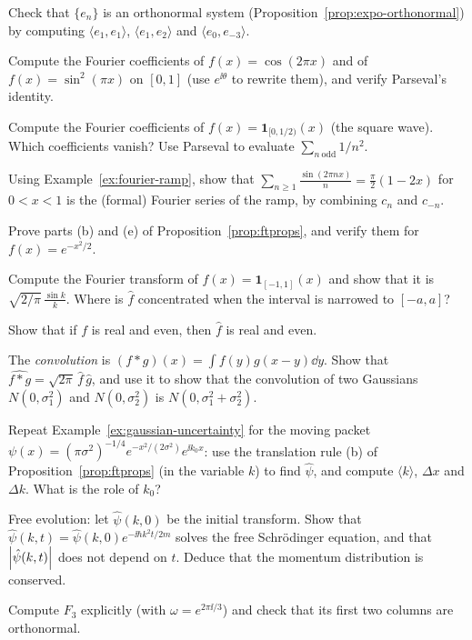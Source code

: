 \begin{exerciseset}
   Check that $\{e_n\}$ is an orthonormal system (Proposition~\ref{prop:expo-orthonormal}) by computing $\langle e_1,e_1\rangle$, $\langle e_1,e_2\rangle$ and $\langle e_0,e_{-3}\rangle$.

   Compute the Fourier coefficients of $f(x)=\cos(2\pi x)$ and of $f(x)=\sin^2(\pi x)$ on $[0,1]$ (use $e^{\ii\theta}$ to rewrite them), and verify Parseval's identity.

   Compute the Fourier coefficients of $f(x)=\mathbf 1_{[0,1/2)}(x)$ (the square wave). Which coefficients vanish? Use Parseval to evaluate $\sum_{n\ \mathrm{odd}}1/n^2$.

   Using Example~\ref{ex:fourier-ramp}, show that $\sum_{n\ge1}\frac{\sin(2\pi nx)}{n}=\frac{\pi}{2}(1-2x)$ for $0<x<1$ is the (formal) Fourier series of the ramp, by combining $c_n$ and $c_{-n}$.

   Prove parts (b) and (e) of Proposition~\ref{prop:ftprops}, and verify them for $f(x)=e^{-x^2/2}$.

   Compute the Fourier transform of $f(x)=\mathbf 1_{[-1,1]}(x)$ and show that it is $\sqrt{2/\pi}\,\frac{\sin k}{k}$. Where is $\hat f$ concentrated when the interval is narrowed to $[-a,a]$?

   Show that if $f$ is real and even, then $\hat f$ is real and even.

   The \emph{convolution} is $(f*g)(x)=\int f(y)g(x-y)\dd y$. Show that $\widehat{f*g}=\sqrt{2\pi}\,\hat f\,\hat g$, and use it to show that the convolution of two Gaussians $N(0,\sigma_1^2)$ and $N(0,\sigma_2^2)$ is $N(0,\sigma_1^2+\sigma_2^2)$.

   Repeat Example~\ref{ex:gaussian-uncertainty} for the moving packet $\psi(x)=(\pi\sigma^2)^{-1/4}e^{-x^2/(2\sigma^2)}e^{\ii k_0x}$: use the translation rule (b) of Proposition~\ref{prop:ftprops} (in the variable $k$) to find $\hat\psi$, and compute $\langle k\rangle$, $\Delta x$ and $\Delta k$. What is the role of $k_0$?

   Free evolution: let $\hat\psi(k,0)$ be the initial transform. Show that $\hat\psi(k,t)=\hat\psi(k,0)e^{-\ii\hbar k^2t/2m}$ solves the free Schr\"odinger equation, and that $\left|\hat\psi(k,t)\right|$ does not depend on $t$. Deduce that the momentum distribution is conserved.

   Compute $F_3$ explicitly (with $\omega=e^{2\pi\ii/3}$) and check that its first two columns are orthonormal.


\end{exerciseset}
